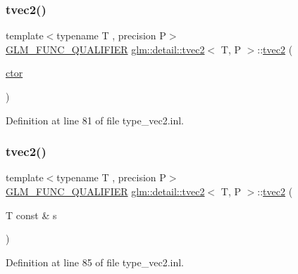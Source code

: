 \subsubsection{\texorpdfstring{tvec2()}{tvec2()}\hspace{0.1cm}{\footnotesize\ttfamily [4/15]}}
{\footnotesize\ttfamily template$<$typename T , precision P$>$ \\
\hyperlink{setup_8hpp_a33fdea6f91c5f834105f7415e2a64407}{G\+L\+M\+\_\+\+F\+U\+N\+C\+\_\+\+Q\+U\+A\+L\+I\+F\+I\+ER} \hyperlink{structglm_1_1detail_1_1tvec2}{glm\+::detail\+::tvec2}$<$ T, P $>$\+::\hyperlink{structglm_1_1detail_1_1tvec2}{tvec2} (\begin{DoxyParamCaption}\item[{\hyperlink{structglm_1_1detail_1_1tvec2_aa0bba0616f425fbd3fb5756aed326386}{ctor}}]{ }\end{DoxyParamCaption})\hspace{0.3cm}{\ttfamily [explicit]}}



Definition at line 81 of file type\+\_\+vec2.\+inl.

\mbox{\label{structglm_1_1detail_1_1tvec2_a85607050278fcecc58b31197bfff1661}} 
\subsubsection{\texorpdfstring{tvec2()}{tvec2()}\hspace{0.1cm}{\footnotesize\ttfamily [5/15]}}
{\footnotesize\ttfamily template$<$typename T , precision P$>$ \\
\hyperlink{setup_8hpp_a33fdea6f91c5f834105f7415e2a64407}{G\+L\+M\+\_\+\+F\+U\+N\+C\+\_\+\+Q\+U\+A\+L\+I\+F\+I\+ER} \hyperlink{structglm_1_1detail_1_1tvec2}{glm\+::detail\+::tvec2}$<$ T, P $>$\+::\hyperlink{structglm_1_1detail_1_1tvec2}{tvec2} (\begin{DoxyParamCaption}\item[{T const \&}]{s }\end{DoxyParamCaption})\hspace{0.3cm}{\ttfamily [explicit]}}



Definition at line 85 of file type\+\_\+vec2.\+inl.

\mbox{\label{structglm_1_1detail_1_1tvec2_a1c01dd00c55f77aae7bbb7e33ca85c54}} 
